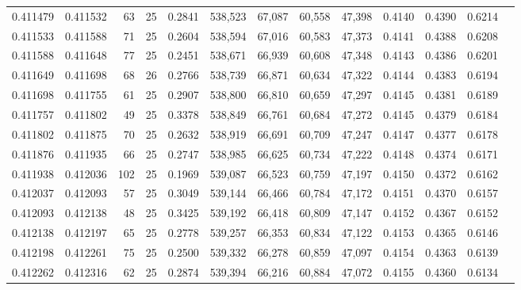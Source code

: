 \begin{tabular}{rrrrrrrrrrrrr}
0.411479 & 0.411532 &    63 &  25 &                                     0.2841 & 538,523 &  67,087 &  60,558 &  47,398 & 0.4140 & 0.4390 & 0.6214 \\
0.411533 & 0.411588 &    71 &  25 &                                     0.2604 & 538,594 &  67,016 &  60,583 &  47,373 & 0.4141 & 0.4388 & 0.6208 \\
0.411588 & 0.411648 &    77 &  25 &                                     0.2451 & 538,671 &  66,939 &  60,608 &  47,348 & 0.4143 & 0.4386 & 0.6201 \\
0.411649 & 0.411698 &    68 &  26 &                                     0.2766 & 538,739 &  66,871 &  60,634 &  47,322 & 0.4144 & 0.4383 & 0.6194 \\
0.411698 & 0.411755 &    61 &  25 &                                     0.2907 & 538,800 &  66,810 &  60,659 &  47,297 & 0.4145 & 0.4381 & 0.6189 \\
0.411757 & 0.411802 &    49 &  25 &                                     0.3378 & 538,849 &  66,761 &  60,684 &  47,272 & 0.4145 & 0.4379 & 0.6184 \\
0.411802 & 0.411875 &    70 &  25 &                                     0.2632 & 538,919 &  66,691 &  60,709 &  47,247 & 0.4147 & 0.4377 & 0.6178 \\
0.411876 & 0.411935 &    66 &  25 &                                     0.2747 & 538,985 &  66,625 &  60,734 &  47,222 & 0.4148 & 0.4374 & 0.6171 \\
0.411938 & 0.412036 &   102 &  25 &                                     0.1969 & 539,087 &  66,523 &  60,759 &  47,197 & 0.4150 & 0.4372 & 0.6162 \\
0.412037 & 0.412093 &    57 &  25 &                                     0.3049 & 539,144 &  66,466 &  60,784 &  47,172 & 0.4151 & 0.4370 & 0.6157 \\
0.412093 & 0.412138 &    48 &  25 &                                     0.3425 & 539,192 &  66,418 &  60,809 &  47,147 & 0.4152 & 0.4367 & 0.6152 \\
0.412138 & 0.412197 &    65 &  25 &                                     0.2778 & 539,257 &  66,353 &  60,834 &  47,122 & 0.4153 & 0.4365 & 0.6146 \\
0.412198 & 0.412261 &    75 &  25 &                                     0.2500 & 539,332 &  66,278 &  60,859 &  47,097 & 0.4154 & 0.4363 & 0.6139 \\
0.412262 & 0.412316 &    62 &  25 &                                     0.2874 & 539,394 &  66,216 &  60,884 &  47,072 & 0.4155 & 0.4360 & 0.6134 \\

\end{tabular}
